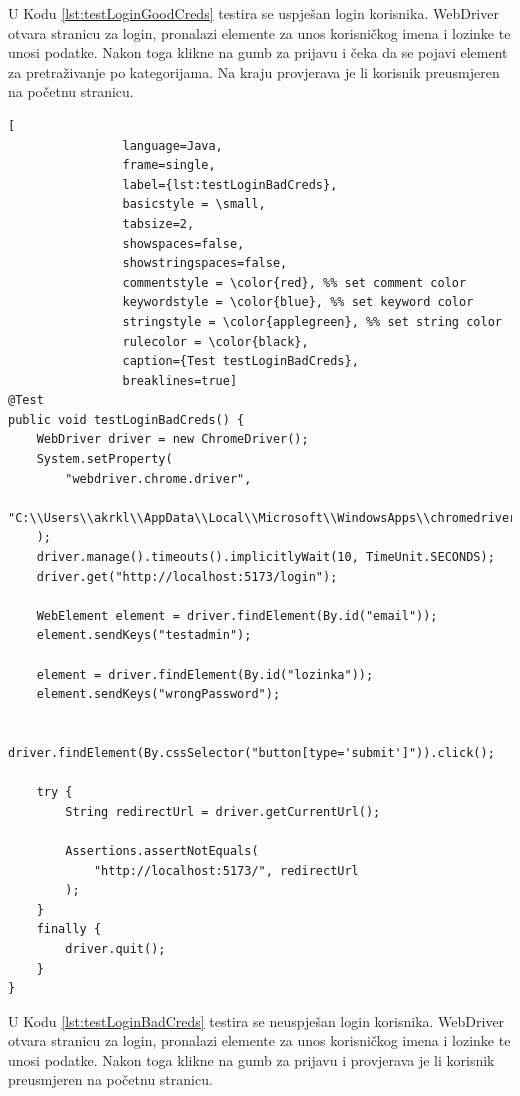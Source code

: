 U Kodu \ref{lst:testLoginGoodCreds} testira se uspješan login korisnika. WebDriver otvara stranicu za login, pronalazi elemente za unos korisničkog imena i lozinke te unosi podatke. Nakon toga klikne na gumb za prijavu i čeka da se pojavi element za pretraživanje po kategorijama. Na kraju provjerava je li korisnik preusmjeren na početnu stranicu.

\pagebreak

\begin{lstlisting}[
				language=Java,
				frame=single,
				label={lst:testLoginBadCreds},
				basicstyle = \small,
				tabsize=2,
				showspaces=false,
				showstringspaces=false,
				commentstyle = \color{red}, %% set comment color
				keywordstyle = \color{blue}, %% set keyword color
				stringstyle = \color{applegreen}, %% set string color
				rulecolor = \color{black},
				caption={Test testLoginBadCreds},
				breaklines=true]
@Test
public void testLoginBadCreds() {
	WebDriver driver = new ChromeDriver();
	System.setProperty(
		"webdriver.chrome.driver",
		"C:\\Users\\akrkl\\AppData\\Local\\Microsoft\\WindowsApps\\chromedriver.exe"
	);
	driver.manage().timeouts().implicitlyWait(10, TimeUnit.SECONDS);
	driver.get("http://localhost:5173/login");

	WebElement element = driver.findElement(By.id("email"));
	element.sendKeys("testadmin");

	element = driver.findElement(By.id("lozinka"));
	element.sendKeys("wrongPassword");

	driver.findElement(By.cssSelector("button[type='submit']")).click();

	try {
		String redirectUrl = driver.getCurrentUrl();

		Assertions.assertNotEquals(
			"http://localhost:5173/", redirectUrl
		);
	}
	finally {
		driver.quit();
	}
}
			\end{lstlisting}

U Kodu \ref{lst:testLoginBadCreds} testira se neuspješan login korisnika. WebDriver otvara stranicu za login, pronalazi elemente za unos korisničkog imena i lozinke te unosi podatke. Nakon toga klikne na gumb za prijavu i provjerava je li korisnik preusmjeren na početnu stranicu.

\pagebreak

